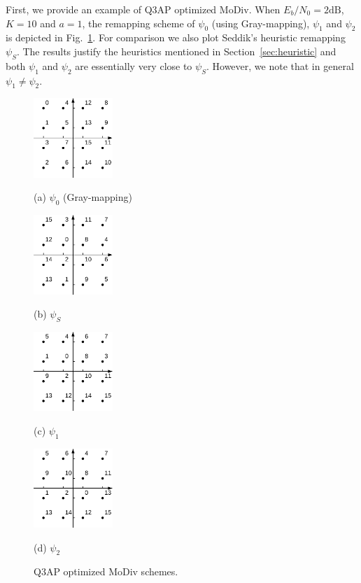 \documentclass[journal]{IEEEtran}
\begin{document}
First, we provide an example of Q3AP optimized MoDiv. When $E_b/N_0 =
2\mbox{dB}$, $K = 10$ and $a = 1$, the remapping scheme of $\psi_0$
(using Gray-mapping), $\psi_1$ and $\psi_2$ is depicted in
Fig.~\ref{fig:example}. For comparison we also plot Seddik's heuristic remapping
$\psi_S$. The results justify the heuristics mentioned in
Section~\ref{sec:heuristic} and both $\psi_1$ and $\psi_2$ are essentially very
close to $\psi_S$. However, we note that in general $\psi_1\not=\psi_2$.

\begin{figure}[!t]
    \begin{minipage}[b]{0.48\linewidth}
      \centering
      \centerline{\includegraphics[width=3.0cm]{./figs/gray.eps}}
      \centerline{(a) $\psi_0$ (Gray-mapping)}\medskip
    \end{minipage}
    \hfill
    \begin{minipage}[b]{0.48\linewidth}
      \centering
      \centerline{\includegraphics[width=3.0cm]{./figs/karim.eps}}
      \centerline{(b) $\psi_S$}\medskip
    \end{minipage}
    \begin{minipage}[b]{0.48\linewidth}
      \centering
      \centerline{\includegraphics[width=3.0cm]{./figs/psi1.eps}}
      \centerline{(c) $\psi_1$}\medskip
    \end{minipage}
    \hfill
    \begin{minipage}[b]{.48\linewidth}
      \centering
      \centerline{\includegraphics[width=3.0cm]{./figs/psi2.eps}}
      \centerline{(d) $\psi_2$}\medskip
    \end{minipage}
    \caption{Q3AP optimized MoDiv schemes.}
    \label{fig:example}
\end{figure}
\end{document}

